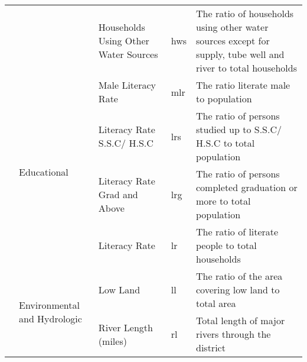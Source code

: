\begin{table*}[!ht]
{\begin{tabular}{|l|l|p{5.1cm}|l|p{9.5cm}|}
                            &                                           & Households Using Other Water Sources            & hws              & The ratio of households using other water sources except for supply, tube well and river to total households                                                                                            \\ \cline{2-5} 
                            & \multirow{4}{*}{Educational}              & Male Literacy Rate                              & mlr              & The ratio literate male to population                                                                                                                                                 \\ \cline{3-5} 
                            &                                           & Literacy Rate S.S.C/ H.S.C                      & lrs              & The ratio of persons studied up to S.S.C/ H.S.C to total population                                                                                                                                    \\ \cline{3-5} 
                            &                                           & Literacy Rate Grad and Above                    & lrg              & The ratio of persons completed graduation or more to total population                                                                                                                                  \\ \cline{3-5} 
                            &                                           & Literacy Rate                                   & lr               & The ratio of literate people to total households                                                                                                                                                       \\ \cline{2-5} 
                            & \multirow{5}{*}{Environmental and Hydrologic }            & Low Land                                        & ll               & The ratio of the area covering low land to total area                                                                                                                                                                 \\ \cline{3-5} 
                            &                                           & River Length (miles)                            & rl               & Total length of major rivers through the district                                                                                                                                     \\ \cline{3-5} 

\end{tabular}}
\end{table*}
